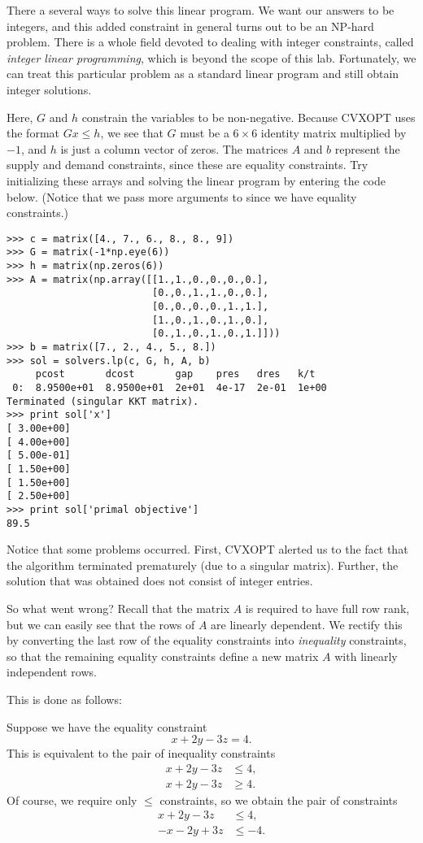 There a several ways to solve this linear program. We want our answers to be integers, and this added constraint in general turns out to be an NP-hard problem.
There is a whole field devoted to dealing with integer constraints, called \emph{integer linear programming}, which is beyond the scope of this lab.
Fortunately, we can treat this particular problem as a standard linear program and still obtain integer solutions.

Here, $G$ and $h$ constrain the variables to be non-negative.
Because CVXOPT uses the format $Gx \leq h$, we see that $G$ must be a $6 \times 6$ identity matrix multiplied by $-1$, and
$h$ is just a column vector of zeros.
The matrices $A$ and $b$ represent the supply and demand constraints, since these are equality constraints.
Try initializing these arrays and solving the linear program by entering the code below. (Notice that
we pass more arguments to  since we have equality constraints.)
\begin{lstlisting}
>>> c = matrix([4., 7., 6., 8., 8., 9])
>>> G = matrix(-1*np.eye(6))
>>> h = matrix(np.zeros(6))
>>> A = matrix(np.array([[1.,1.,0.,0.,0.,0.],
                         [0.,0.,1.,1.,0.,0.],
                         [0.,0.,0.,0.,1.,1.],
                         [1.,0.,1.,0.,1.,0.],
                         [0.,1.,0.,1.,0.,1.]]))
>>> b = matrix([7., 2., 4., 5., 8.])
>>> sol = solvers.lp(c, G, h, A, b)
     pcost       dcost       gap    pres   dres   k/t
 0:  8.9500e+01  8.9500e+01  2e+01  4e-17  2e-01  1e+00
Terminated (singular KKT matrix).
>>> print sol['x']
[ 3.00e+00]
[ 4.00e+00]
[ 5.00e-01]
[ 1.50e+00]
[ 1.50e+00]
[ 2.50e+00]
>>> print sol['primal objective']
89.5
\end{lstlisting}
Notice that some problems occurred. First, CVXOPT alerted us to the fact that the algorithm terminated prematurely (due to a singular matrix).
Further, the solution that was obtained does not consist of integer entries.

So what went wrong? Recall that the matrix $A$ is required to have full row rank, but we can easily see that the rows of $A$
are linearly dependent. We rectify this by converting the last row of the equality constraints into \emph{inequality} constraints, so that
the remaining equality constraints define a new matrix $A$ with linearly independent rows.

This is done as follows:

 Suppose we have the equality constraint
\[
x + 2y - 3z = 4.
\]
This is equivalent to the pair of inequality
constraints
\begin{align*}
x + 2y - 3z &\leq 4, \\
x + 2y - 3z &\geq 4.
\end{align*}
Of course, we require only $\leq$ constraints, so we obtain the pair
of constraints
\begin{align*}
x + 2y - 3z &\leq 4, \\
-x - 2y + 3z &\leq -4.
\end{align*}

